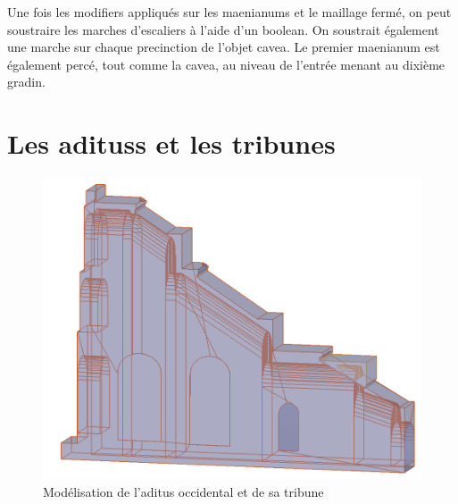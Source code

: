 Une fois les \glspl{modifier} appliqués sur les \glspl{maenianum} et le maillage fermé, on peut soustraire les marches d'escaliers à l'aide d'un \gls{boolean}. On soustrait également une marche sur chaque \gls{precinction} de l'objet \gls{cavea}. Le premier \gls{maenianum} est également percé, tout comme la \gls{cavea}, au niveau de l'entrée menant au dixième gradin.

		
\section{Les \glspl{aditus} et les tribunes} 

\begin{figure}[!h]
	\includegraphics[width=\linewidth]{images/modAditus}
	\caption{Modélisation de l'\gls{aditus} occidental et de sa tribune} 
	\label{modAditus} 
\end{figure}  
		
